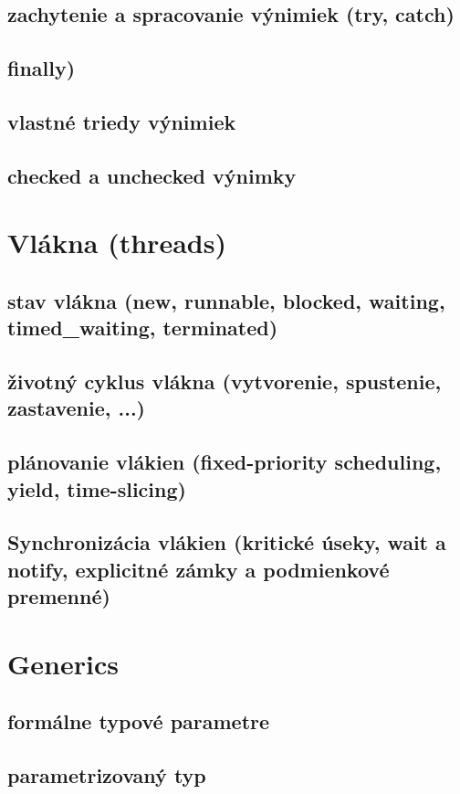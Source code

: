 \subsection{zachytenie a spracovanie výnimiek (try, catch)}
\subsection{finally)}
\subsection{vlastné triedy výnimiek}
\subsection{checked a unchecked výnimky}

\section{Vlákna (threads)}
\subsection{stav vlákna (new, runnable, blocked, waiting, timed\_waiting, terminated)}
\subsection{životný cyklus vlákna (vytvorenie, spustenie, zastavenie, ...)}
\subsection{plánovanie vlákien (fixed-priority scheduling, yield, time-slicing)}
\subsection{Synchronizácia vlákien (kritické úseky, wait a notify, explicitné zámky a podmienkové premenné)}

\section{Generics}
\subsection{formálne typové parametre}
\subsection{parametrizovaný typ}
